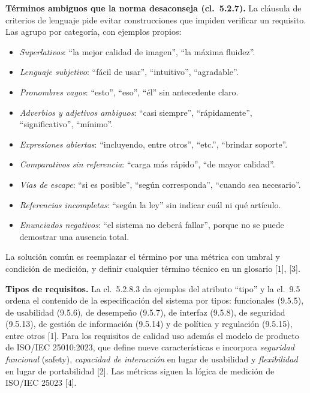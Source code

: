 \documentclass[11pt,a4paper]{article}
\newcommand{\cl}[1]{cl.~#1}
\begin{document}
\textbf{T\'erminos ambiguos que la norma desaconseja (\cl{5.2.7}).} La cl\'ausula de criterios de lenguaje pide evitar construcciones que impiden verificar un requisito. Las agrupo por categor\'ia, con ejemplos propios:
\begin{itemize}
  \item \emph{Superlativos}: ``la mejor calidad de imagen'', ``la m\'axima fluidez''.
  \item \emph{Lenguaje subjetivo}: ``f\'acil de usar'', ``intuitivo'', ``agradable''.
  \item \emph{Pronombres vagos}: ``esto'', ``eso'', ``\'el'' sin antecedente claro.
  \item \emph{Adverbios y adjetivos ambiguos}: ``casi siempre'', ``r\'apidamente'', ``significativo'', ``m\'inimo''.
  \item \emph{Expresiones abiertas}: ``incluyendo, entre otros'', ``etc.'', ``brindar soporte''.
  \item \emph{Comparativos sin referencia}: ``carga m\'as r\'apido'', ``de mayor calidad''.
  \item \emph{V\'ias de escape}: ``si es posible'', ``seg\'un corresponda'', ``cuando sea necesario''.
  \item \emph{Referencias incompletas}: ``seg\'un la ley'' sin indicar cu\'al ni qu\'e art\'iculo.
  \item \emph{Enunciados negativos}: ``el sistema no deber\'a fallar'', porque no se puede demostrar una ausencia total.
\end{itemize}
La soluci\'on com\'un es reemplazar el t\'ermino por una m\'etrica con umbral y condici\'on de medici\'on, y definir cualquier t\'ermino t\'ecnico en un glosario [1], [3].

\textbf{Tipos de requisitos.} La \cl{5.2.8.3} da ejemplos del atributo ``tipo'' y la \cl{9.5} ordena el contenido de la especificaci\'on del sistema por tipos: funcionales (9.5.5), de usabilidad (9.5.6), de desempe\~no (9.5.7), de interfaz (9.5.8), de seguridad (9.5.13), de gesti\'on de informaci\'on (9.5.14) y de pol\'itica y regulaci\'on (9.5.15), entre otros [1]. Para los requisitos de calidad uso adem\'as el modelo de producto de ISO/IEC 25010:2023, que define nueve caracter\'isticas e incorpora \emph{seguridad funcional} (safety), \emph{capacidad de interacci\'on} en lugar de usabilidad y \emph{flexibilidad} en lugar de portabilidad [2]. Las m\'etricas siguen la l\'ogica de medici\'on de ISO/IEC 25023 [4].

\end{document}
